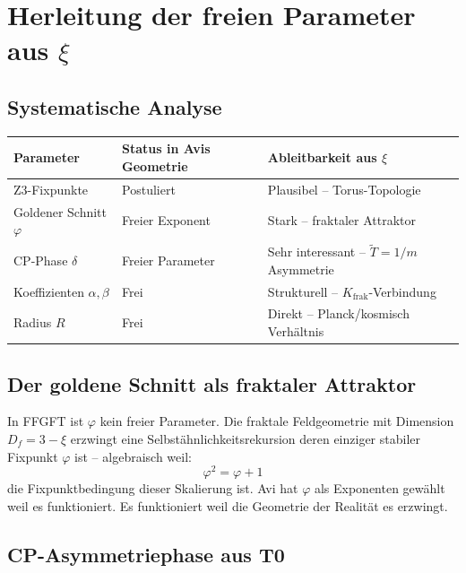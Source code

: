 \documentclass[12pt, a4paper]{article}
\newcommand{\xipar}{\xi}
\newcommand{\Tfield}{\tilde{T}}
\newcommand{\Kfrak}{K_{\text{frak}}}
\newcommand{\Dfrak}{D_f}
\begin{document}
\section{Herleitung der freien Parameter aus $\xipar$}

\subsection{Systematische Analyse}

\begin{center}
\begin{tabular}{@{}lll@{}}
\toprule
Parameter & Status in Avis Geometrie & Ableitbarkeit aus $\xipar$ \\
\midrule
Z3-Fixpunkte & Postuliert & Plausibel -- Torus-Topologie \\
Goldener Schnitt $\varphi$ & Freier Exponent & Stark -- fraktaler Attraktor \\
CP-Phase $\delta$ & Freier Parameter & Sehr interessant -- $\Tfield = 1/m$ Asymmetrie \\
Koeffizienten $\alpha, \beta$ & Frei & Strukturell -- $\Kfrak$-Verbindung \\
Radius $R$ & Frei & Direkt -- Planck/kosmisch Verhältnis \\
\bottomrule
\end{tabular}
\end{center}

\subsection{Der goldene Schnitt als fraktaler Attraktor}

In FFGFT ist $\varphi$ kein freier Parameter. Die fraktale Feldgeometrie mit Dimension $\Dfrak = 3 - \xipar$ erzwingt eine Selbstähnlichkeitsrekursion deren einziger stabiler Fixpunkt $\varphi$ ist -- algebraisch weil:
\begin{equation}
  \varphi^2 = \varphi + 1
\end{equation}
die Fixpunktbedingung dieser Skalierung ist. Avi hat $\varphi$ als Exponenten gewählt weil es funktioniert. Es funktioniert weil die Geometrie der Realität es erzwingt.

\subsection{CP-Asymmetriephase aus T0}
\end{document}

